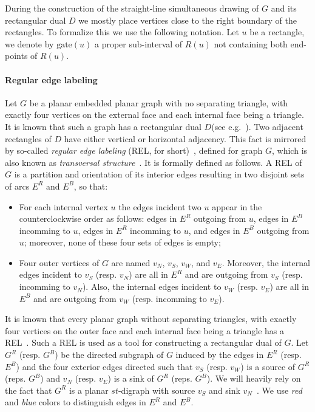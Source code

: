 \documentclass{llncs}
\newcommand{\gate}{\textrm{gate}}
\begin{document}
During the construction of the straight-line simultaneous drawing of $G$ and its rectangular dual $D$ we mostly place vertices close to the right boundary of the rectangles. To formalize this we use the following notation. Let $u$ be a rectangle, we denote by $\gate(u)$  a proper sub-interval of $R(u)$ not containing both end-points of $R(u)$.   


\paragraph{\bf Regular edge labeling}
Let $G$ be a planar embedded planar graph with no separating triangle, with exactly four vertices on the external face and each internal face being a triangle. It is known that such a graph has a rectangular dual  $D$(see e.g.~\cite{He93}). Two adjacent rectangles of $D$ have either vertical or horizontal adjacency. This fact is mirrored by  so-called \emph{regular edge labeling} (REL, for short)~\cite{He93}, defined for graph $G$, which is also known as \emph{transversal structure}~\cite{Fusy09}. It is formally defined as follows. A REL of $G$ is a partition and orientation of its interior edges resulting in two disjoint sets of arcs $E^R$ and $E^B$, so that:
\begin{itemize}
\item For each internal vertex $u$ the edges incident two $u$ appear in the counterclockwise order as follows: edges in $E^R$ outgoing from $u$, edges in $E^B$ incomming to $u$, edges in $E^R$ incomming to $u$, and edges in $E^B$ outgoing from $u$; moreover, none of these four sets of edges is empty;
\item Four outer vertices of $G$ are named $v_N$, $v_S$, $v_W$, and $v_E$. Moreover, the internal edges incident to $v_S$ (resp. $v_N$) are all in $E^R$ and are outgoing from $v_S$ (resp. incomming to $v_N$). Also, the internal edges incident to $v_W$ (resp. $v_E$) are all in $E^B$ and are outgoing from $v_W$ (resp. incomming to  $v_E$).
\end{itemize}
It is known that every planar graph without separating triangles, with exactly four vertices on the outer face and each internal face being a triangle has a REL~\cite[Theorem~2.2]{He93}. Such a REL is used as a tool for constructing a rectangular dual of $G$. Let $G^R$ (resp. $G^B$) be the directed subgraph of $G$ induced by the edges in $E^R$ (resp. $E^B$) and the four exterior edges directed such that $v_S$ (resp. $v_W$) is a source of $G^R$ (reps. $G^B$) and $v_N$ (resp. $v_E$) is  a sink of $G^R$ (reps. $G^B$).  We will heavily rely on the fact that $G^R$ is a planar $st$-digraph with source $v_S$  and sink $v_N$~\cite[Lemma 2.3]{He93}. We use \emph{red} and \emph{blue} colors to distinguish edges in $E^R$ and $E^B$. 
\end{document}
